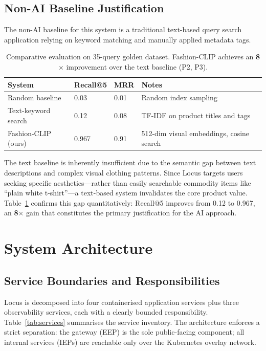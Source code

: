 \documentclass[12pt]{article}
\begin{document}
\subsection{Non-AI Baseline Justification}

The non-AI baseline for this system is a traditional text-based query search application relying on keyword matching and manually applied metadata tags.

\begin{table}[H]
\centering
\small
\begin{tabular}{@{}llll@{}}
\toprule
\textbf{System} & \textbf{Recall@5} & \textbf{MRR} & \textbf{Notes} \\ \midrule
Random baseline        & 0.03  & 0.01 & Random index sampling \\
Text-keyword search    & 0.12  & 0.08 & TF-IDF on product titles and tags \\
Fashion-CLIP (ours)    & 0.967 & 0.91 & 512-dim visual embeddings, cosine search \\ \bottomrule
\end{tabular}
\caption{Comparative evaluation on 35-query golden dataset. Fashion-CLIP achieves an \textbf{8$\times$} improvement over the text baseline (P2, P3).}
\label{tab:baseline}
\end{table}

The text baseline is inherently insufficient due to the semantic gap between text descriptions and complex visual clothing patterns. Since Locus targets users seeking specific aesthetics---rather than easily searchable commodity items like ``plain white t-shirt''---a text-based system invalidates the core product value. Table~\ref{tab:baseline} confirms this gap quantitatively: Recall@5 improves from 0.12 to 0.967, an \textbf{8$\times$} gain that constitutes the primary justification for the AI approach.

\section{System Architecture}

\subsection{Service Boundaries and Responsibilities}
\label{sec:services}

Locus is decomposed into four containerised application services plus three observability services, each with a clearly bounded responsibility. Table~\ref{tab:services} summarises the service inventory. The architecture enforces a strict separation: the gateway (EEP) is the sole public-facing component; all internal services (IEPs) are reachable only over the Kubernetes overlay network.
\end{document}
